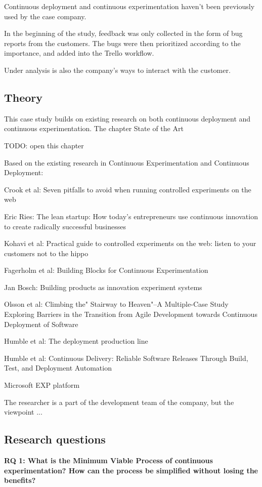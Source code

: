 \documentclass[english]{tktltiki2}
\theoremstyle{definition}
\theoremstyle{remark}
\begin{document}
Continuous deployment and continuous experimentation haven't been previously used by the case company.  

In the beginning of the study, feedback was only collected in the form of bug reports from the customers. The bugs were then prioritized according to the importance, and added into the Trello workflow. 

Under analysis is also the company's ways to interact with the customer.

\subsection{Theory} %

This case study builds on existing research on both continuous deployment and continuous experimentation. The chapter State of the Art 

TODO: open this chapter

Based on the existing research in Continuous Experimentation and Continuous Deployment:

Crook et al: Seven pitfalls to avoid when running controlled experiments on the web

Eric Ries: The lean startup: How today's entrepreneurs use continuous innovation to create radically successful businesses

Kohavi et al: Practical guide to controlled experiments on the web: listen to your customers not to the hippo

Fagerholm et al: Building Blocks for Continuous Experimentation

Jan Bosch: Building products as innovation experiment systems

Olsson et al: Climbing the" Stairway to Heaven"--A Multiple-Case Study Exploring Barriers in the Transition from Agile Development towards Continuous Deployment of Software

Humble et al: The deployment production line

Humble et al: Continuous Delivery: Reliable Software Releases Through Build, Test, and Deployment Automation

Microsoft EXP platform

The researcher is a part of the development team of the company, but the viewpoint ...

\subsection{Research questions} %
\noindent \textbf{RQ 1: What is the Minimum Viable Process of continuous experimentation? How can the process be simplified without losing the benefits?}
\end{document}

